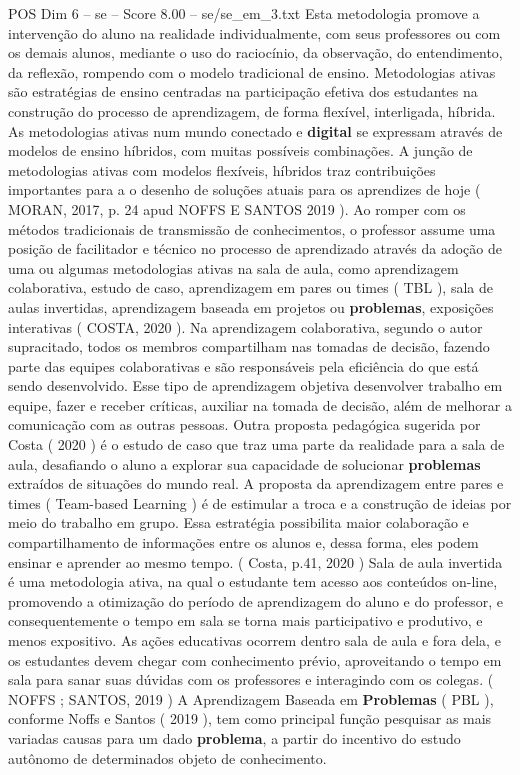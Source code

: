 \begin{textsample}{POS Dim 6 – se – Score 8.00 – se/se\_em\_3.txt}
Esta metodologia promove a intervenção do aluno na realidade individualmente, com seus professores ou com os demais alunos, mediante o uso do raciocínio, da observação, do entendimento, da reflexão, rompendo com o modelo tradicional de ensino.
Metodologias ativas são estratégias de ensino centradas na participação efetiva dos estudantes na construção do processo de aprendizagem, de forma flexível, interligada, híbrida.
As metodologias ativas num mundo conectado e \textbf{digital} se expressam através de modelos de ensino híbridos, com muitas possíveis combinações.
A junção de metodologias ativas com modelos flexíveis, híbridos traz contribuições importantes para a o desenho de soluções atuais para os aprendizes de hoje ( MORAN, 2017, p. 24 apud NOFFS E SANTOS 2019 ).
Ao romper com os métodos tradicionais de transmissão de conhecimentos, o professor assume uma posição de facilitador e técnico no processo de aprendizado através da adoção de uma ou algumas metodologias ativas na sala de aula, como aprendizagem colaborativa, estudo de caso, aprendizagem em pares ou times ( TBL ), sala de aulas invertidas, aprendizagem baseada em projetos ou \textbf{problemas}, exposições interativas ( COSTA, 2020 ).
Na aprendizagem colaborativa, segundo o autor supracitado, todos os membros compartilham nas tomadas de decisão, fazendo parte das equipes colaborativas e são responsáveis pela eficiência do que está sendo desenvolvido.
Esse tipo de aprendizagem objetiva desenvolver trabalho em equipe, fazer e receber críticas, auxiliar na tomada de decisão, além de melhorar a comunicação com as outras pessoas.
Outra proposta pedagógica sugerida por Costa ( 2020 ) é o estudo de caso que traz uma parte da realidade para a sala de aula, desafiando o aluno a explorar sua capacidade de solucionar \textbf{problemas} extraídos de situações do mundo real.
A proposta da aprendizagem entre pares e times ( Team-based Learning ) é de estimular a troca e a construção de ideias por meio do trabalho em grupo.
Essa estratégia possibilita maior colaboração e compartilhamento de informações entre os alunos e, dessa forma, eles podem ensinar e aprender ao mesmo tempo. ( Costa, p.41, 2020 ) Sala de aula invertida é uma metodologia ativa, na qual o estudante tem acesso aos conteúdos on-line, promovendo a otimização do período de aprendizagem do aluno e do professor, e consequentemente o tempo em sala se torna mais participativo e produtivo, e menos expositivo.
As ações educativas ocorrem dentro sala de aula e fora dela, e os estudantes devem chegar com conhecimento prévio, aproveitando o tempo em sala para sanar suas dúvidas com os professores e interagindo com os colegas. ( NOFFS ; SANTOS, 2019 ) A Aprendizagem Baseada em \textbf{Problemas} ( PBL ), conforme Noffs e Santos ( 2019 ), tem como principal função pesquisar as mais variadas causas para um dado \textbf{problema}, a partir do incentivo do estudo autônomo de determinados objeto de conhecimento.

\end{textsample}
